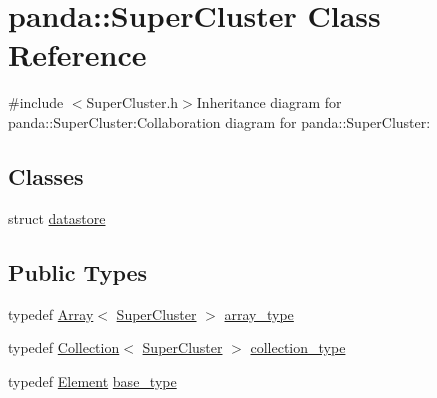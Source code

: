 \hypertarget{classpanda_1_1SuperCluster}{
\section{panda::SuperCluster Class Reference}
\label{classpanda_1_1SuperCluster}
}


{\ttfamily \#include $<$SuperCluster.h$>$}Inheritance diagram for panda::SuperCluster:Collaboration diagram for panda::SuperCluster:\subsection*{Classes}
\begin{DoxyCompactItemize}
\item 
struct \hyperlink{structpanda_1_1SuperCluster_1_1datastore}{datastore}
\end{DoxyCompactItemize}
\subsection*{Public Types}
\begin{DoxyCompactItemize}
\item 
typedef \hyperlink{classpanda_1_1Array}{Array}$<$ \hyperlink{classpanda_1_1SuperCluster}{SuperCluster} $>$ \hyperlink{classpanda_1_1SuperCluster_a07efcd94dd507a541afe78bdb8e365f9}{array\_\-type}
\item 
typedef \hyperlink{classpanda_1_1Collection}{Collection}$<$ \hyperlink{classpanda_1_1SuperCluster}{SuperCluster} $>$ \hyperlink{classpanda_1_1SuperCluster_aaf5d3b9ba38cb0ac66de7fab09f58530}{collection\_\-type}
\item 
typedef \hyperlink{classpanda_1_1Element}{Element} \hyperlink{classpanda_1_1SuperCluster_ac758e93cf5909e6c943c622795671e99}{base\_\-type}
\end{DoxyCompactItemize}
